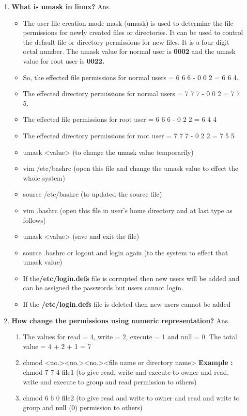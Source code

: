 \begin{enumerate}
    \item \textbf{What is umask in linux?}
    \newline
    Ans.
    \newline
    \begin{itemize}
        \item The user file-creation mode mask (umask) is used to determine the file permissions for newly created files or 	directories. It can be used to control the default file or directory permissions for new files. It is a four-digit octal number.  The umask value for normal user is \textbf{0002 }and the umask value for root user is \textbf{0022.}
        \item So, the effected file permissions for normal users  = 6 6 6   -   0 0 2  =   6 6 4.
        \item The effected directory permissions for normal users  = 7 7 7  -  0 0 2  =  7 7 5.
        \item The effected file permissions for root user  = 6 6 6   -   0 2 2   =   6 4 4
        \item The effected directory permissions for root user  =  7 7 7  -  0 2 2   =   7 5 5
        \item umask	<value> 	(to change the umask value temporarily)
        \item vim   /etc/bashrc (open this file and change the umask value to effect the whole system)
        \item source   /etc/bashrc	(to updated the source file)
        \item vim  .bashrc	(open this file in user's home directory and at last type as follows)
        \item umask	<value>	(save and exit the file)
        \item source   .bashrc   or  logout and login again (to the system to effect that umask value)
        \item If the\textbf{/etc/login.defs }   file is corrupted then new users will be added and can be assigned the passwords  but   users cannot login.
        \item  If the   \textbf{/etc/login.defs} file is deleted then new users cannot be added
    \end{itemize}

    \bigskip
    \bigskip

    \item \textbf{How change the permissions using numeric representation?}
    Ans.\begin{enumerate}
          \item The values for  read = 4,  write = 2,  execute = 1  and  null = 0.  The total value = 4 + 2 + 1 = 7
          \item chmod    <no.><no.><no.><file name  or  directory name>
          \textbf{Example : }chmod   7 7 4    file1	(to give read, write and execute to owner and read, write 
          and execute to     group and read permission to others)
          \item chmod   6 6 0	  file2 (to give read and write to owner and read and write to group and null (0)  permission to others)
        \end{enumerate}


\end{enumerate}
